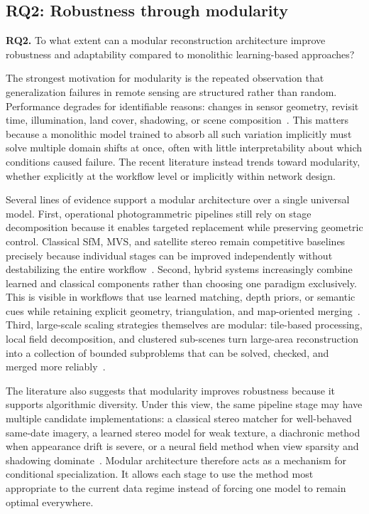 \subsection{RQ2: Robustness through modularity}

\textbf{RQ2.} To what extent can a modular reconstruction architecture improve robustness and adaptability compared to monolithic learning-based approaches?

The strongest motivation for modularity is the repeated observation that generalization failures in remote sensing are structured rather than random. Performance degrades for identifiable reasons: changes in sensor geometry, revisit time, illumination, land cover, shadowing, or scene composition~\cite{Masquil2026,SatDepth2025,SEO2025}. This matters because a monolithic model trained to absorb all such variation implicitly must solve multiple domain shifts at once, often with little interpretability about which conditions caused failure. The recent literature instead trends toward modularity, whether explicitly at the workflow level or implicitly within network design.

Several lines of evidence support a modular architecture over a single universal model. First, operational photogrammetric pipelines still rely on stage decomposition because it enables targeted replacement while preserving geometric control. Classical SfM, MVS, and satellite stereo remain competitive baselines precisely because individual stages can be improved independently without destabilizing the entire workflow~\cite{Schonberger2016,Schonberger2016MVS,deFranchis2014,Planet4Stereo2025}. Second, hybrid systems increasingly combine learned and classical components rather than choosing one paradigm exclusively. This is visible in workflows that use learned matching, depth priors, or semantic cues while retaining explicit geometry, triangulation, and map-oriented merging~\cite{SatDN2025,MVSR3D2025,Elias2025}. Third, large-scale scaling strategies themselves are modular: tile-based processing, local field decomposition, and clustered sub-scenes turn large-area reconstruction into a collection of bounded subproblems that can be solved, checked, and merged more reliably~\cite{SnakeNeRF2025,BirdNeRF2025,Zhou2026}.

The literature also suggests that modularity improves robustness because it supports algorithmic diversity. Under this view, the same pipeline stage may have multiple candidate implementations: a classical stereo matcher for well-behaved same-date imagery, a learned stereo model for weak texture, a diachronic method when appearance drift is severe, or a neural field method when view sparsity and shadowing dominate~\cite{Masquil2026,ShadowGS2026,FoundationStereo2025}. Modular architecture therefore acts as a mechanism for conditional specialization. It allows each stage to use the method most appropriate to the current data regime instead of forcing one model to remain optimal everywhere.

